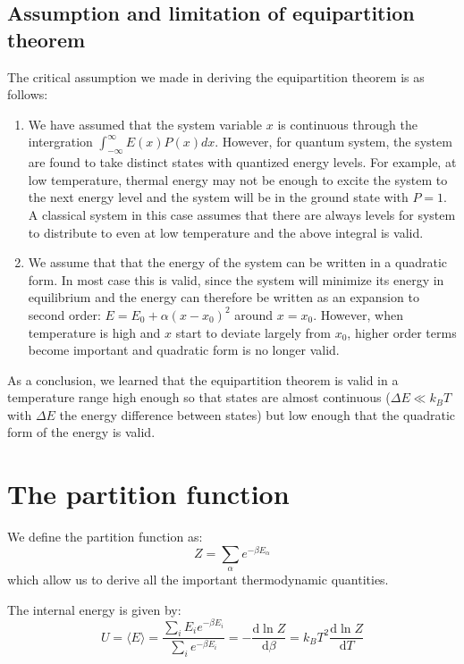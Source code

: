 \documentclass{article}
\newcommand{\dnor}{\text{d}}
\begin{document}
\subsection{Assumption and limitation of equipartition theorem}
The critical assumption we made in deriving the equipartition theorem is 
as follows:
\begin{enumerate}
    \item We have assumed that the system variable $x$ is continuous through the intergration $\int_{-\infty}^{\infty} E(x) P(x) dx$.
            However, for quantum system, the system are found to take distinct states with quantized energy levels. For example, at low temperature,
            thermal energy may not be enough to excite the system to the next energy level and the system will be in the ground state with $P = 1$.
            A classical system in this case assumes that there are always levels for system to distribute to even at low temperature and the above 
            integral is valid. 
    \item We assume that that the energy of the system can be written in a quadratic form. In most case this is valid, since the system will 
            minimize its energy in equilibrium and the energy can therefore be written as an expansion to second order: $ E = E_0 + \alpha (x - x_0)^2$ 
            around $x =x_0$. However, when temperature is high and $x$ start to deviate largely from $x_0$, 
            higher order terms become important and quadratic form is no longer valid.
\end{enumerate}
As a conclusion, we learned that the equipartition theorem is valid in a temperature range high enough so that states are almost continuous ($\Delta E \ll k_B T$ with
$\Delta E$ the energy difference between states) but 
low enough that the quadratic form of the energy is valid.

\section{The partition function}
We define the partition function as:
\begin{equation}
    Z = \sum_{\alpha} e^{-\beta E_{\alpha}}
\end{equation}
which allow us to derive all the important thermodynamic quantities. 

The internal energy is given by:
\begin{equation}
    U = \langle E \rangle = \frac{\sum_{i} E_i e^{-\beta E_i}}{\sum_{i} e^{-\beta E_i}} = -\frac{\dnor \ln Z}{\dnor\beta} = k_BT^2\frac{\dnor \ln Z}{\dnor T}
\end{equation}
\end{document}
